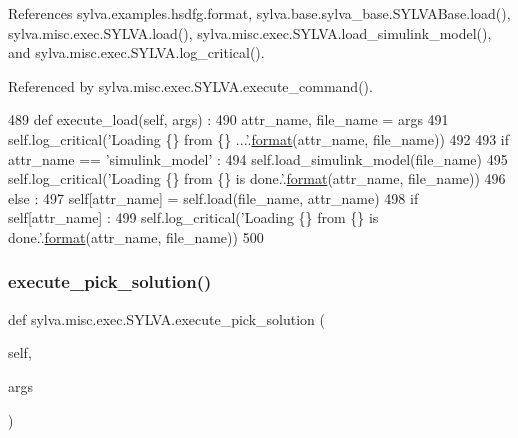 References sylva.\+examples.\+hsdfg.\+format, sylva.\+base.\+sylva\+\_\+base.\+S\+Y\+L\+V\+A\+Base.\+load(), sylva.\+misc.\+exec.\+S\+Y\+L\+V\+A.\+load(), sylva.\+misc.\+exec.\+S\+Y\+L\+V\+A.\+load\+\_\+simulink\+\_\+model(), and sylva.\+misc.\+exec.\+S\+Y\+L\+V\+A.\+log\+\_\+critical().



Referenced by sylva.\+misc.\+exec.\+S\+Y\+L\+V\+A.\+execute\+\_\+command().


\begin{DoxyCode}
489   \textcolor{keyword}{def }execute\_load(self, args) :
490     attr\_name, file\_name = args
491     self.log\_critical(\textcolor{stringliteral}{'Loading \{\} from \{\} ...'}.\hyperlink{namespacesylva_1_1examples_1_1hsdfg_ab3510a0b8457362330aa4d9fd2209590}{format}(attr\_name, file\_name))
492 
493     \textcolor{keywordflow}{if} attr\_name == \textcolor{stringliteral}{'simulink\_model'} :
494       self.load\_simulink\_model(file\_name)
495       self.log\_critical(\textcolor{stringliteral}{'Loading \{\} from \{\} is done.'}.\hyperlink{namespacesylva_1_1examples_1_1hsdfg_ab3510a0b8457362330aa4d9fd2209590}{format}(attr\_name, file\_name))
496     \textcolor{keywordflow}{else} :
497       self[attr\_name] = self.load(file\_name, attr\_name)
498       \textcolor{keywordflow}{if} self[attr\_name] :
499         self.log\_critical(\textcolor{stringliteral}{'Loading \{\} from \{\} is done.'}.\hyperlink{namespacesylva_1_1examples_1_1hsdfg_ab3510a0b8457362330aa4d9fd2209590}{format}(attr\_name, file\_name))
500 
\end{DoxyCode}
\mbox{\label{classsylva_1_1misc_1_1exec_1_1_s_y_l_v_a_a06ccbb90cddd35e6f7c037bbc5148e93}} 
\subsubsection{\texorpdfstring{execute\+\_\+pick\+\_\+solution()}{execute\_pick\_solution()}}
{\footnotesize\ttfamily def sylva.\+misc.\+exec.\+S\+Y\+L\+V\+A.\+execute\+\_\+pick\+\_\+solution (\begin{DoxyParamCaption}\item[{}]{self,  }\item[{}]{args }\end{DoxyParamCaption})}



